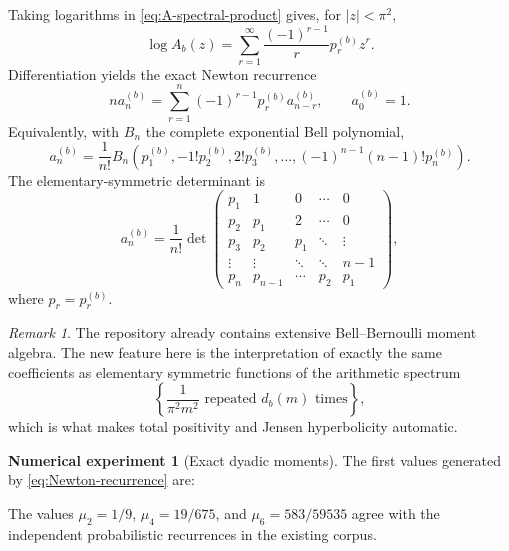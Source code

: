 \documentclass[11pt]{article}
\theoremstyle{definition}
\newtheorem{experiment}[theorem]{Numerical experiment}
\theoremstyle{remark}
\newtheorem{remark}[theorem]{Remark}
\begin{document}
Taking logarithms in \eqref{eq:A-spectral-product} gives, for \(|z|<\pi^2\),
\begin{equation}\label{eq:logA-series}
  \log A_b(z)=\sum_{r=1}^{\infty}
  \frac{(-1)^{r-1}}{r}p_r^{(b)}z^r.
\end{equation}
Differentiation yields the exact Newton recurrence
\begin{equation}\label{eq:Newton-recurrence}
  n a_n^{(b)}=
  \sum_{r=1}^{n}(-1)^{r-1}p_r^{(b)}a_{n-r}^{(b)},
  \qquad a_0^{(b)}=1.
\end{equation}
Equivalently, with \(B_n\) the complete exponential Bell polynomial,
\begin{equation}\label{eq:Bell-form}
 a_n^{(b)}=\frac1{n!}
 B_n\!\left(p_1^{(b)},-1!p_2^{(b)},2!p_3^{(b)},\ldots,
 (-1)^{n-1}(n-1)!p_n^{(b)}\right).
\end{equation}
The elementary-symmetric determinant is
\begin{equation}\label{eq:Newton-determinant}
  a_n^{(b)}=\frac1{n!}
  \det\begin{pmatrix}
  p_1&1&0&\cdots&0\\
  p_2&p_1&2&\cdots&0\\
  p_3&p_2&p_1&\ddots&\vdots\\
  \vdots&\vdots&\ddots&\ddots&n-1\\
  p_n&p_{n-1}&\cdots&p_2&p_1
  \end{pmatrix},
\end{equation}
where \(p_r=p_r^{(b)}\).

\begin{remark}
The repository already contains extensive Bell--Bernoulli moment algebra.  The new feature here is the interpretation of exactly the same coefficients as elementary symmetric functions of the arithmetic spectrum
\[
 \left\{\frac1{\pi^2m^2}\text{ repeated }d_b(m)\text{ times}\right\},
\]
which is what makes total positivity and Jensen hyperbolicity automatic.
\end{remark}

\begin{experiment}[Exact dyadic moments]
The first values generated by \eqref{eq:Newton-recurrence} are:
\begin{center}
\resizebox{\textwidth}{!}{}
\end{center}
The values \(\mu_2=1/9\), \(\mu_4=19/675\), and
\(\mu_6=583/59535\) agree with the independent probabilistic recurrences in the existing corpus.
\end{experiment}
\end{document}
